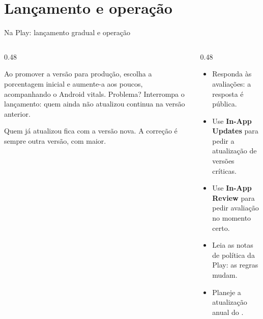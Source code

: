 \documentclass[aspectratio=169,10pt]{beamer}
\begin{document}
\section{Lançamento e operação}

\begin{frame}{Na Play: lançamento gradual e operação}
  \begin{columns}[T]
    \begin{column}{0.48\textwidth}
      \begin{conceito}
        Ao promover a versão para produção, escolha a porcentagem inicial e aumente-a aos poucos, acompanhando o Android vitals. Problema? Interrompa o lançamento: quem ainda não atualizou continua na versão anterior.
      \end{conceito}
      \begin{atencao}
        Quem já atualizou fica com a versão nova. A correção é sempre outra versão, com  maior.
      \end{atencao}
    \end{column}
    \begin{column}{0.48\textwidth}
      \begin{dica}
        \begin{itemize}
          \item Responda às avaliações: a resposta é pública.
          \item Use \textbf{In-App Updates} para pedir a atualização de versões críticas.
          \item Use \textbf{In-App Review} para pedir avaliação no momento certo.
          \item Leia as notas de política da Play: as regras mudam.
          \item Planeje a atualização anual do .
        \end{itemize}
      \end{dica}
    \end{column}
  \end{columns}
\end{frame}
\end{document}
